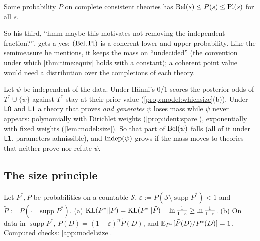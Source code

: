 \begin{proposition}\label{prop:sound:bracket}
Some probability $P$ on complete consistent theories has $\mathrm{Bel}(s)\le P(s)\le\mathrm{Pl}(s)$ for all $s$.
\end{proposition}

\noindent So his third, ``hmm maybe this motivates not removing the independent fraction?'', gets a yes: $(\mathrm{Bel},\mathrm{Pl})$ is a coherent lower and upper probability. Like the semimeasure he mentions, it keeps the mass on ``undecided'' (the convention under which \cref{thm:time:equiv} holds with a constant); a coherent point value would need a distribution over the completions of each theory.

\begin{remark}\label{rem:sound:indep}
Let $\psi$ be independent of the data. Under H\"anni's 0/1 scores the posterior odds of $T^*\cup\{\psi\}$ against $T^*$ stay at their prior value (\cref{prop:model:whichsize}(b)). Under $\mathord{\mathsf{L0}}$ and $\mathord{\mathsf{L1}}$ a theory that proves \emph{and generates} $\psi$ loses mass while $\psi$ never appears: polynomially with Dirichlet weights (\cref{prop:ident:spare}), exponentially with fixed weights (\cref{lem:model:size}). So that part of $\mathrm{Bel}(\psi)$ falls (all of it under $\mathord{\mathsf{L1}}$, parameters admissible), and $\mathrm{Indep}(\psi)$ grows if the mass moves to theories that neither prove nor refute $\psi$.
\end{remark}

\subsection{The size principle}\label{sec:model:size}

\begin{lemma}\label{lem:model:size}
Let $P^*,P$ be probabilities on a countable $\mathcal S$, $\varepsilon:=P(\mathcal S\setminus\operatorname{supp}P^*)<1$ and $\tilde P:=P(\cdot\mid\operatorname{supp}P^*)$.
(a) $\mathrm{KL}(P^*\|P)=\mathrm{KL}(P^*\|\tilde P)+\ln\frac1{1-\varepsilon}\ge\ln\frac1{1-\varepsilon}$.
(b) On data in $\operatorname{supp}P^*$, $P(D)=(1-\varepsilon)^n\tilde P(D)$, and $\mathbb{E}_{P^*}[\tilde P(D)/P^*(D)]=1$. Computed checks: \cref{app:model:size}.
\end{lemma}

